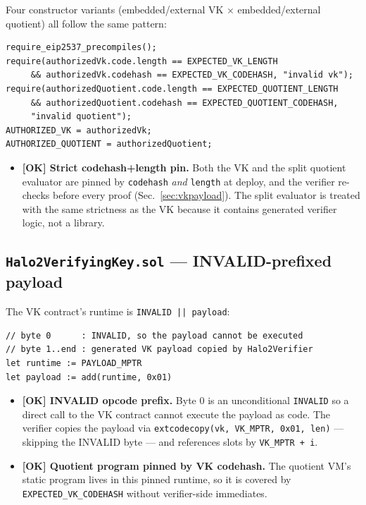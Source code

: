 Four constructor variants (embedded/external VK $\times$
embedded/external quotient) all follow the same pattern:
\begin{lstlisting}[style=plain]
require_eip2537_precompiles();
require(authorizedVk.code.length == EXPECTED_VK_LENGTH
     && authorizedVk.codehash == EXPECTED_VK_CODEHASH, "invalid vk");
require(authorizedQuotient.code.length == EXPECTED_QUOTIENT_LENGTH
     && authorizedQuotient.codehash == EXPECTED_QUOTIENT_CODEHASH,
     "invalid quotient");
AUTHORIZED_VK = authorizedVk;
AUTHORIZED_QUOTIENT = authorizedQuotient;
\end{lstlisting}
\begin{itemize}
  \item \textcolor{tracegreen}{\textbf{[OK] Strict codehash+length pin.}}
        Both the VK and the split quotient evaluator are pinned by
        \texttt{codehash} \emph{and} \texttt{length} at deploy, and the
        verifier re-checks before every proof (Sec.~\ref{sec:vkpayload}).
        The split evaluator is treated with the same strictness as the VK
        because it contains generated verifier logic, not a library.
\end{itemize}

\subsection{\texttt{Halo2VerifyingKey.sol} --- INVALID-prefixed payload}
\label{sec:vk-contract}

The VK contract's runtime is \texttt{INVALID || payload}:
\begin{lstlisting}[style=plain]
// byte 0      : INVALID, so the payload cannot be executed
// byte 1..end : generated VK payload copied by Halo2Verifier
let runtime := PAYLOAD_MPTR
let payload := add(runtime, 0x01)
\end{lstlisting}
\begin{itemize}
  \item \textcolor{tracegreen}{\textbf{[OK] INVALID opcode prefix.}}
        Byte 0 is an unconditional \texttt{INVALID} so a direct call to
        the VK contract cannot execute the payload as code. The verifier
        copies the payload via
        \texttt{extcodecopy(vk, VK\_\allowbreak{}MPTR, 0x01, len)} --- skipping the
        INVALID byte --- and references slots by \texttt{VK\_MPTR + i}.
  \item \textcolor{tracegreen}{\textbf{[OK] Quotient program pinned by
        VK codehash.}} The quotient VM's static program lives in this
        pinned runtime, so it is covered by \texttt{EXPECTED\_\allowbreak{}VK\_\allowbreak{}CODEHASH}
        without verifier-side immediates.
\end{itemize}

